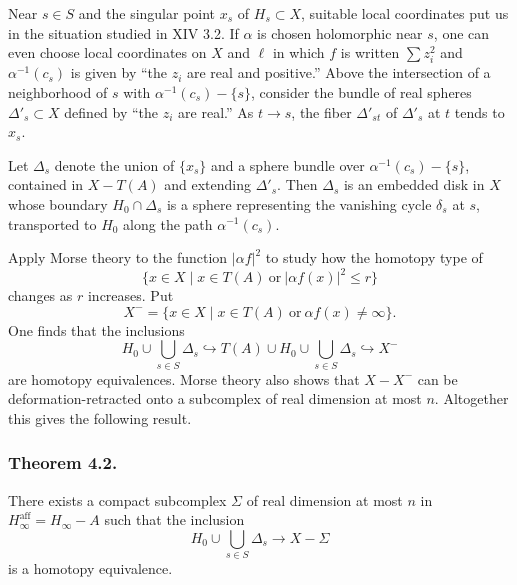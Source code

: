 Near $s\in S$ and the singular point $x_s$ of $H_s\subset X$, suitable
local coordinates put us in the situation studied in XIV 3.2.  If
$\alpha$ is chosen holomorphic near $s$, one can even choose local
coordinates on $X$ and $\ell$ in which $f$ is written
$\sum z_i^2$ and $\alpha^{-1}(c_s)$ is given by ``the $z_i$ are real and
positive.''  Above the intersection of a neighborhood of $s$ with
$\alpha^{-1}(c_s)-\{s\}$, consider the bundle of real spheres
$\Delta'_s\subset X$ defined by ``the $z_i$ are real.''  As $t\to s$, the
fiber $\Delta'_{st}$ of $\Delta'_s$ at $t$ tends to $x_s$.

Let $\Delta_s$ denote the union of $\{x_s\}$ and a sphere bundle over
$\alpha^{-1}(c_s)-\{s\}$, contained in $X-T(A)$ and extending
$\Delta'_s$.  Then $\Delta_s$ is an embedded disk in $X$ whose boundary
$H_0\cap\Delta_s$ is a sphere representing the vanishing cycle $\delta_s$
at $s$, transported to $H_0$ along the path $\alpha^{-1}(c_s)$.

Apply Morse theory to the function $|\alpha f|^2$ to study how the
homotopy type of
\[
 \{x\in X\mid x\in T(A)\ \text{or}\ |\alpha f(x)|^2\leq r\}
\]
changes as $r$ increases.  Put
\[
 X^- = \{x\in X\mid x\in T(A)\ \text{or}\ \alpha f(x)\ne\infty\}.
\]
One finds that the inclusions
\[
 H_0\cup\bigcup_{s\in S}\Delta_s
 \hookrightarrow
 T(A)\cup H_0\cup\bigcup_{s\in S}\Delta_s
 \hookrightarrow X^-
\]
are homotopy equivalences.  Morse theory also shows that $X-X^-$ can be
deformation-retracted onto a subcomplex of real dimension at most $n$.
Altogether this gives the following result.

\subsubsection*{Theorem 4.2.}
There exists a compact subcomplex $\Sigma$ of real dimension at most $n$ in
$H_\infty^{\mathrm{aff}}=H_\infty-A$ such that the inclusion
\[
 H_0\cup\bigcup_{s\in S}\Delta_s\longrightarrow X-\Sigma
\]
is a homotopy equivalence.

